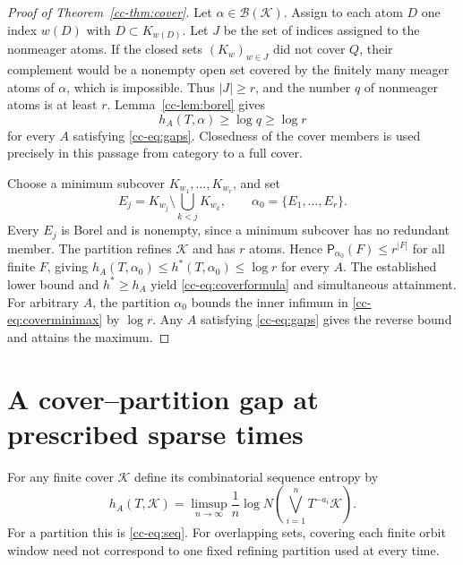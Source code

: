 \documentclass[11pt,reqno]{amsart}
\numberwithin{equation}{section}
\theoremstyle{definition}
\newcommand{\Patt}{\mathsf P}
\newcommand{\hpat}{h^{*}}
\newcommand{\K}{\mathcal K}
\begin{document}
\begin{proof}[Proof of Theorem~\ref{cc-thm:cover}]
Let $\alpha\in\mathcal B(\K)$. Assign to each atom $D$ one index
$w(D)$ with $D\subset K_{w(D)}$. Let $J$ be the set of indices assigned
to the nonmeager atoms. If the closed sets $(K_w)_{w\in J}$ did not
cover $Q$, their complement would be a nonempty open set covered by
the finitely many meager atoms of $\alpha$, which is impossible.
Thus $|J|\ge r$, and the number $q$ of nonmeager atoms is at least $r$.
Lemma~\ref{cc-lem:borel} gives
\[
 h_A(T,\alpha)\ge\log q\ge\log r
\]
for every $A$ satisfying \eqref{cc-eq:gaps}. Closedness of the cover
members is used precisely in this passage from category to a full cover.

Choose a minimum subcover $K_{w_1},\ldots,K_{w_r}$, and set
\begin{equation}\label{cc-eq:ordered}
 E_j=K_{w_j}\setminus\bigcup_{k<j}K_{w_k},\qquad
 \alpha_0=\{E_1,\ldots,E_r\}.
\end{equation}
Every $E_j$ is Borel and is nonempty, since a minimum subcover has no
redundant member. The partition refines $\K$ and has $r$ atoms. Hence
$\Patt_{\alpha_0}(F)\le r^{|F|}$ for all finite $F$, giving
$h_A(T,\alpha_0)\le\hpat(T,\alpha_0)\le\log r$ for every $A$.
The established lower bound and $\hpat\ge h_A$ yield
\eqref{cc-eq:coverformula} and simultaneous attainment.
For arbitrary $A$, the partition $\alpha_0$ bounds the inner infimum
in \eqref{cc-eq:coverminimax} by $\log r$. Any $A$ satisfying
\eqref{cc-eq:gaps} gives the reverse bound and attains the maximum.
\end{proof}


\section{A cover--partition gap at prescribed sparse times}

For any finite cover $\K$ define its combinatorial sequence entropy by
\[
 h_A(T,\K)=\limsup_{n\to\infty}\frac1n
 \log N\left(\bigvee_{i=1}^n T^{-a_i}\K\right).
\]
For a partition this is \eqref{cc-eq:seq}. For overlapping sets, covering
each finite orbit window need not correspond to one fixed refining
partition used at every time.
\end{document}
